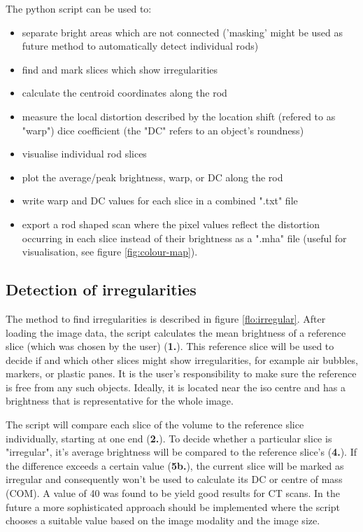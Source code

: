 The python script can be used to:
\begin{itemize}
 \item separate bright areas which are not connected ('masking' might be used as future method to automatically detect individual rods)
 \item find and mark slices which show irregularities
 \item calculate the centroid coordinates along the rod
 \item measure the local distortion described by the
  \subitem location shift (refered to as "warp")
  \subitem dice coefficient (the "DC" refers to an object's roundness)
 \item visualise individual rod slices
 \item plot the average/peak brightness, warp, or DC along the rod
 \item write warp and DC values for each slice in a combined ".txt" file
 \item export a rod shaped scan where the pixel values reflect the distortion occurring in each slice instead of their brightness as a ".mha" file (useful for visualisation, see figure \ref{fig:colour-map}).
\end{itemize}


\subsection{Detection of irregularities}

The method to find irregularities is described in figure \ref{flo:irregular}.
After loading the image data, the script calculates the mean brightness of a reference slice (which was chosen by the user) (\textbf{1.}).
This reference slice will be used to decide if and which other slices might show irregularities, for example air bubbles, markers, or plastic panes.
It is the user's responsibility to make sure the reference is free from any such objects.
Ideally, it is located near the iso centre and has a brightness that is representative for the whole image.

The script will compare each slice of the volume to the reference slice individually, starting at one end (\textbf{2.}).
To decide whether a particular slice is "irregular", it's average brightness will be compared to the reference slice's (\textbf{4.}).
If the difference exceeds a certain value (\textbf{5b.}), the current slice will be marked as irregular and consequently won't be used to calculate its DC or centre of mass (COM).
A value of 40 was found to be yield good results for CT scans.
In the future a more sophisticated approach should be implemented where the script chooses a suitable value based on the image modality and the image size.


